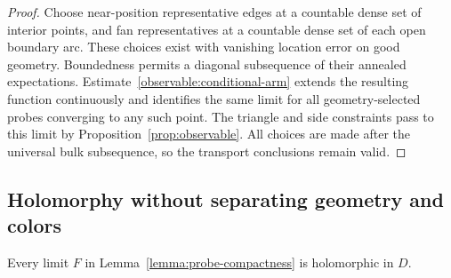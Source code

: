 \begin{proof}
Choose near-position representative edges at a countable dense set of
interior points, and fan representatives at a countable dense set of each
open boundary arc. These choices exist with vanishing location error on
good geometry. Boundedness permits a diagonal subsequence of their
annealed expectations. Estimate~\eqref{observable:conditional-arm}
extends the resulting function continuously and identifies the same
limit for all geometry-selected probes converging to any such point.
The triangle and side constraints pass to this limit by
Proposition~\ref{prop:observable}. All choices are made after the
universal bulk subsequence, so the transport conclusions remain valid.
\end{proof}

\subsection{Holomorphy without separating geometry and colors}

\begin{proposition}[Holomorphy]
\label{prop:holomorphy}
Every limit $F$ in Lemma~\ref{lemma:probe-compactness} is holomorphic in
$D$.
\end{proposition}


